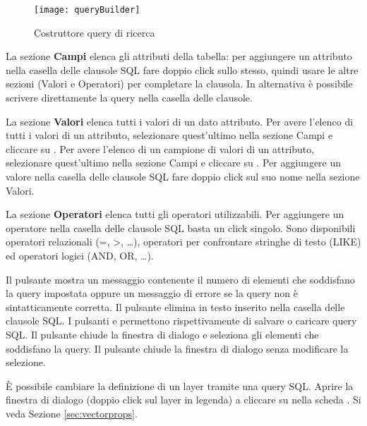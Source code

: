 \begin{figure}[ht]
  \centering
    \texttt{[image: queryBuilder]}
    \caption{Costruttore query di ricerca \nixcaption}\label{fig:query_builder}
\end{figure}

La sezione \textbf{Campi} elenca gli attributi della tabella: per aggiungere un
attributo nella casella delle clausole SQL fare doppio click sullo stesso, quindi 
usare le altre sezioni (Valori e Operatori) per completare la clausola.
In alternativa è possibile scrivere direttamente la query nella casella delle clausole.

La sezione \textbf{Valori} elenca tutti i valori di un dato attributo. Per avere
l'elenco di tutti i valori di un attributo, selezionare quest'ultimo nella sezione Campi e
cliccare su  . 
Per avere l'elenco di un campione di valori di un attributo, selezionare quest'ultimo 
nella sezione Campi e cliccare su  .
Per aggiungere un valore nella casella delle clausole SQL fare doppio click sul suo nome 
nella sezione Valori.

La sezione \textbf{Operatori} elenca tutti gli operatori utilizzabili. Per aggiungere un
operatore nella casella delle clausole SQL basta un click singolo. Sono disponibili 
operatori relazionali (=, >, \dots), operatori per confrontare stringhe di testo (LIKE)
ed operatori logici (AND, OR, \dots).

Il pulsante  mostra un messaggio contenente il numero di elementi che 
soddisfano la query impostata oppure un messaggio di errore se la query non è
sintatticamente corretta. 
Il pulsante  elimina in testo inserito nella casella delle clausole SQL.
I pulsanti  e  permettono rispettivamente di 
salvare o caricare query SQL. 
Il pulsante  chiude la finestra di dialogo e seleziona gli elementi che 
soddisfano la query. 
Il pulsante  chiude la finestra di dialogo senza modificare la selezione.

\begin{Tip}\caption{\textsc{Cambiare la definizione di un layer}}
È possibile cambiare la definizione di un layer tramite una query SQL.
Aprire la finestra di dialogo  (doppio click sul layer in legenda)
a cliccare su  nella scheda . Si veda Sezione
\ref{sec:vectorprops}.
\end{Tip}

